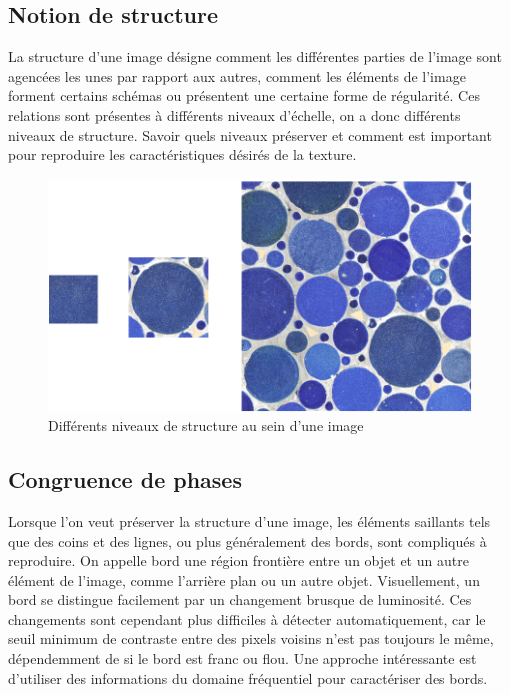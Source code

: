 \subsection*{Notion de structure}

La structure d'une image désigne comment les différentes parties de l'image sont agencées les unes par rapport aux autres, comment les éléments de l'image forment certains schémas ou présentent une certaine forme de régularité. Ces relations sont présentes à différents niveaux d'échelle, on a donc différents niveaux de structure. Savoir quels niveaux préserver et comment est important pour reproduire les caractéristiques désirés de la texture.

\begin{figure}[h!]
    \centering
    \includegraphics[width=.85\linewidth]{contenu/resources/images/structure_level}
    \caption{Différents niveaux de structure au sein d'une image}
    \label{fig:structure_level}
\end{figure}

\subsection*{Congruence de phases}

Lorsque l'on veut préserver la structure d'une image, les éléments saillants tels que des coins et des lignes, ou plus généralement des bords, sont compliqués à reproduire. On appelle bord une région frontière entre un objet et un autre élément de l'image, comme l'arrière plan ou un autre objet. Visuellement, un bord se distingue facilement par un changement brusque de luminosité. Ces changements sont cependant plus difficiles à détecter automatiquement, car le seuil minimum de contraste entre des pixels voisins n'est pas toujours le même, dépendemment de si le bord est franc ou flou. Une approche intéressante est d'utiliser des informations du domaine fréquentiel pour caractériser des bords.

